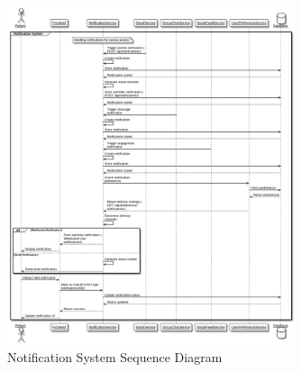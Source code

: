 \begin{figure}[H]
    \centering
    \includegraphics[width=0.75\textwidth]{Notifications_Sequence_Diagram.png}
    \caption{Notification System Sequence Diagram}
    \label{fig:notifications-sequence-diagram}
\end{figure}


